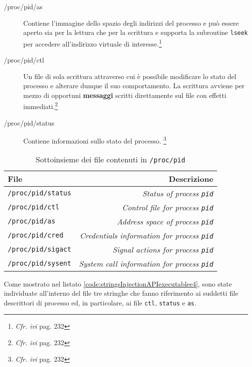 \documentclass[10pt,a4paper, titlepage]{report}
\begin{document}
\begin{description}
\item[/proc/pid/as] Contiene l'immagine dello spazio degli indirizzi del processo e può essere aperto sia per la lettura che per la scrittura e supporta la subroutine \texttt{lseek} per accedere all'indirizzo virtuale di interesse.\footnote{\textit{Cfr. ivi} pag. 232}

\item[/proc/pid/ctl] Un file di sola scrittura attraverso cui è possibile modificare lo stato del processo e alterare dunque il suo comportamento. La scrittura avviene per mezzo di opportuni \textbf{messaggi} scritti direttamente sul file con effetti immediati.\footnote{\textit{Cfr. ivi} pag. 232}

\item[/proc/pid/status] Contiene informazioni sullo stato del processo. \footnote{\textit{Cfr. ivi} pag. 232}
\end{description}

\begin{table}[h!]
 
    \caption{Sottoinsieme dei file contenuti in \texttt{/proc/pid} }
    \centering
    \label{tab:AIXProcessFiles}
    
    \begin{tabular}{l|r}
      \toprule
      File & Descrizione \\
      \midrule
      \texttt{/proc/pid/status} & \textit{Status of process \texttt{pid}} \\
      \hline
      \texttt{/proc/pid/ctl} & \textit{Control file for process \texttt{pid}} \\
       \hline
      \texttt{/proc/pid/as} & \textit{Address space of process \texttt{pid}} \\
       \hline
      \texttt{/proc/pid/cred} & \textit{Credentials information for process \texttt{pid}} \\
       \hline
      \texttt{/proc/pid/sigact} &\textit{Signal actions for process \texttt{pid}} \\
       \hline
      \texttt{/proc/pid/sysent} & \textit{System call information for process \texttt{pid}}\\
       
      \bottomrule
    \end{tabular}
\end{table}

Come mostrato nel listato \ref{code:stringsInjectionAPIexecutablee4}, sono state individuate all'interno del file tre stringhe che fanno riferimento ai suddetti file descrittori di processo ed, in particolare, ai file \texttt{ctl}, \texttt{status} e \texttt{as}.
\end{document}
